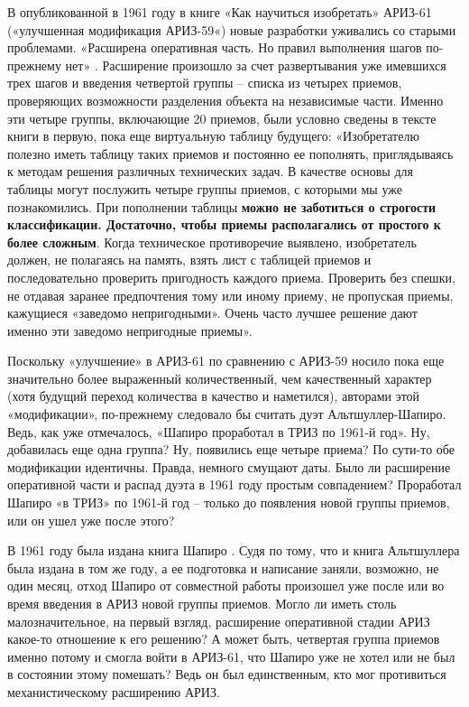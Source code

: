 \documentclass[11pt,a4paper]{article}
\begin{document}
В опубликованной в 1961 году в книге «Как научиться изобретать»
\cite{Altshuller1961} АРИЗ-61 («улучшенная модификация АРИЗ-59«) новые
разработки уживались со старыми проблемами. «Расширена оперативная часть. Но
правил выполнения шагов по-прежнему нет» \cite{Altshuller1986a}. Расширение
произошло за счет развертывания уже имевшихся трех шагов и введения четвертой
группы -- списка из четырех приемов, проверяющих возможности разделения
объекта на независимые части. Именно эти четыре группы, включающие 20 приемов,
были условно сведены в тексте книги в первую, пока еще виртуальную таблицу
будущего: «Изобретателю полезно иметь таблицу таких приемов и постоянно ее
пополнять, приглядываясь к методам решения различных технических задач. В
качестве основы для таблицы могут послужить четыре группы приемов, с которыми
мы уже познакомились. При пополнении таблицы \textbf{можно не заботиться о
  строгости классификации. Достаточно, чтобы приемы располагались от простого
  к более сложным}. Когда техническое противоречие выявлено, изобретатель
должен, не полагаясь на память, взять лист с таблицей приемов и
последовательно проверить пригодность каждого приема. Проверить без спешки, не
отдавая заранее предпочтения тому или иному приему, не пропуская приемы,
кажущиеся «заведомо непригодными». Очень часто лучшее решение дают именно эти
заведомо непригодные приемы».

Поскольку «улучшение» в АРИЗ-61 по сравнению с АРИЗ-59 носило пока еще
значительно более выраженный количественный, чем качественный характер (хотя
будущий переход количества в качество и наметился), авторами этой
«модификации», по-прежнему следовало бы считать дуэт Альтшуллер-Шапиро. Ведь,
как уже отмечалось, «Шапиро проработал в ТРИЗ по 1961-й год». Ну, добавилась
еще одна группа? Ну, появились еще четыре приема? По сути-то обе модификации
идентичны. Правда, немного смущают даты. Было ли расширение оперативной части
и распад дуэта в 1961 году простым совпадением? Проработал Шапиро «в ТРИЗ» по
1961-й год -- только до появления новой группы приемов, или он ушел уже после
этого?

В 1961 году была издана книга Шапиро \cite{Bachmatov1961}. Судя по тому, что и
книга Альтшуллера была издана в том же году, а ее подготовка и написание
заняли, возможно, не один месяц, отход Шапиро от совместной работы произошел
уже после или во время введения в АРИЗ новой группы приемов. Могло ли иметь
столь малозначительное, на первый взгляд, расширение оперативной стадии АРИЗ
какое-то отношение к его решению? А может быть, четвертая группа приемов
именно потому и смогла войти в АРИЗ-61, что Шапиро уже не хотел или не был в
состоянии этому помешать? Ведь он был единственным, кто мог противиться
механистическому расширению АРИЗ.
\end{document}
